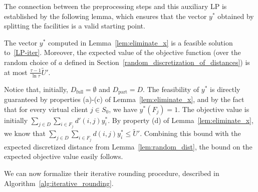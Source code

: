 The connection between the preprocessing steps and this auxiliary LP is established by the following lemma, which ensures that the vector $y^*$ obtained by splitting the facilities is a valid starting point.

\begin{lemma} \label{lem:iter_lp_feasible}
The vector $y^*$ computed in Lemma~\ref{lem:eliminate_x} is a feasible solution to~\eqref{LP-iter}. Moreover, the expected value of the objective function (over the random choice of $a$ defined in Section~\ref{random_discretization_of_distances}) is at most $\frac{\tau-1}{\ln \tau} \tilde{U}'$.
\end{lemma}

Notice that, initially, $D_\text{full} = \emptyset$ and $D_\text{part} = D$. The feasibility of $y^*$ is directly guaranteed by properties (a)-(c) of Lemma~\ref{lem:eliminate_x}, and by the fact that for every virtual client $j \in S_0$, we have $y^*(F_j) = 1$. The objective value is initially $\sum_{j \in D} \sum_{i \in F_j} d'(i,j)y_i^*$. By property (d) of Lemma~\ref{lem:eliminate_x}, we know that $\sum_{j \in D} \sum_{i \in F_j} d(i,j)y_i^* \le \tilde{U}'$. Combining this bound with the expected discretized distance from Lemma~\ref{lem:random_dist}, the bound on the expected objective value easily follows.

We can now formalize their iterative rounding procedure, described in {Algorithm~\ref{alg:iterative_rounding}}.

